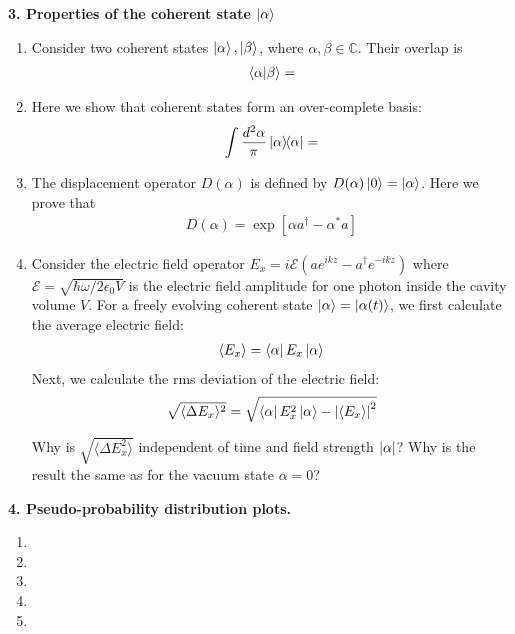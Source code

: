 \documentclass{article}
\theoremstyle{definition}
\newcommand{\al}{\alpha}
\newcommand{\be}{\beta}
\newcommand{\f}[2]{\frac{#1}{#2}}
\newcommand{\lp}{\left(}
\newcommand{\rp}{\right)}
\newcommand{\lb}{\left[}
\newcommand{\rb}{\right]}
\begin{document}
\noindent \textbf{3. Properties of the coherent state $\ket{\al}$}

\begin{enumerate}[label=\alph*)]
	\item Consider two coherent states $\ket{\al}, \ket{\be}$, where $\al,\be\in \mathbb{C}$. Their overlap is 
	\begin{align*}
		\bra{\al}\ket{\be} = 
	\end{align*}


	\item Here we show that coherent states form an over-complete basis:
	\begin{align*}
		\int \f{d^2\al}{\pi} \ketbra{\al} = 
	\end{align*}
	
	\item The displacement operator $D(\al)$ is defined by $D(\al)\ket{0} = \ket{\al}$. Here we prove that 
	\begin{align*}
		D(\al) = \exp\lb \al a^\dagger - \al^* a \rb
	\end{align*}
	
	\item Consider the electric field operator $E_x = i\mathcal{E}\lp ae^{ikz} - a^\dagger e^{-ikz} \rp$ where $\mathcal{E} = \sqrt{\hbar\omega/2\epsilon_0V}$ is the electric field amplitude for one photon inside the cavity volume $V$. For a freely evolving coherent state $\ket{\al} = \ket{\al(t)}$, we first calculate the average electric field:
	\begin{align*}
		\langle E_x \rangle = \bra{\al} E_x \ket{\al} 
	\end{align*}
	Next, we calculate the rms deviation of the electric field:
	\begin{align*}
		\sqrt{\langle \Delta E_x \rangle^2} = \sqrt{\bra{\al} E_x^2 \ket{\al} - \abs{\langle E_x \rangle}^2}
	\end{align*}

	Why is $\sqrt{\langle \Delta E_x^2\rangle} $ independent of time and field strength $\abs{\al}$? Why is the result the same as for the vacuum state $\al = 0$?
\end{enumerate}




\noindent \textbf{4. Pseudo-probability distribution plots.}

\begin{enumerate}[label=\alph*)]
	\item 
	
	\item 
	
	\item 
	
	\item 
	
	\item 
\end{enumerate}
\end{document}
